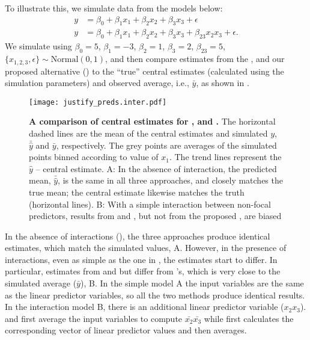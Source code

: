 To illustrate this, we simulate data from the models below:
%
\begin{align}
y &= \beta_0 + \beta_1x_1 + \beta_2x_2 + \beta_3x_3 + \epsilon \label{eq:simple_inter_higher_no_interaction}\\
y &= \beta_0 + \beta_1x_1 + \beta_2x_2 + \beta_3x_3 + \beta_{23}x_2x_3 + \epsilon \label{eq:simple_inter_higher}.
\end{align}
%
We simulate using $\beta_0 = 5$, $\beta_1 = -3$, $\beta_2 = 1$, $\beta_3 = 2$, $\beta_{23} = 5$, $\{x_{1,2,3}, \epsilon\} \sim \mathrm{Normal}(0, 1)$, and then compare estimates from the ,  and our proposed alternative () to the ``true'' central estimates (calculated using the simulation parameters) and observed average, i.e., $\bar{y}$, as shown in .
%
\begin{figure}
\begin{center}
\texttt{[image: justify\_preds.inter.pdf]}
\end{center}
\caption{{\bf A comparison of central estimates for ,  and .} The horizontal dashed lines are the mean of the central estimates and simulated $y$, $\bar{\hat{y}}$ and $\bar{y}$, respectively. The grey points are averages of the simulated points binned according to value of $x_1$. The trend lines represent the $\hat{y}$ -- central estimate. A: In the absence of interaction, the predicted mean, $\bar{\hat{y}}$, is the same in all three approaches, and closely matches the true mean; the central estimate likewise matches the truth (horizontal lines). B: With a simple interaction between non-focal predictors, results from  and , but not from the proposed , are biased}
\label{fig:justify_plots}
\end{figure}
%
In the absence of interactions (), the three approaches produce identical estimates, which match the simulated values, A. However, in the presence of interactions, even as simple as the one in , the estimates start to differ. In particular, estimates from  and  but differ from 's, which is very close to the simulated average ($\bar{y}$), B.
In the simple model A the input variables are the same as the linear predictor variables, so all the two methods produce identical results.
In the interaction model B, there is an additional linear predictor variable ($x_2x_3$).  and  first average the input variables to compute $\bar{x_2}\bar{x_3}$ while  first calculates the corresponding vector of linear predictor values and then averages. 


